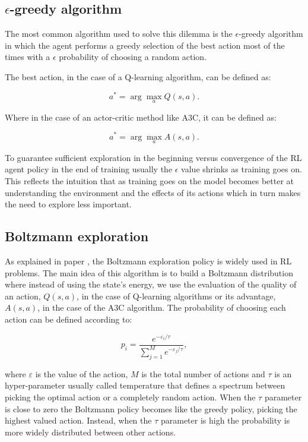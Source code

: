 \subsection{$\epsilon$-greedy algorithm}
\noindent The most common algorithm used to solve this dilemma is the $\epsilon$-greedy algorithm in which the agent performs a greedy selection of the best action most of the times with a $\epsilon$ probability of choosing a random action.

The best action, in the case of a Q-learning algorithm, can be defined as:

\begin{equation}
    a^* =\arg\max\limits_{a} Q(s, a).
\end{equation}

Where in the case of an actor-critic method like A3C, it can be defined as:

\begin{equation}
    a^* =\arg\max\limits_{a} A(s, a).
\end{equation}

To guarantee sufficient exploration in the beginning versus convergence of the \acrshort{RL} agent policy in the end of training usually the $\epsilon$ value shrinks as training goes on. This reflects the intuition that as training goes on the model becomes better at understanding the environment and the effects of its actions which in turn makes the need to explore less important.

\subsection{Boltzmann exploration} \label{boltz}
\noindent As explained in paper \cite{boltz}, the Boltzmann exploration policy is widely used in \acrshort{RL} problems. The main idea of this algorithm is to build a Boltzmann distribution where instead of using the state's energy, we use the evaluation of the quality of an action, $Q(s,a)$, in the case of Q-learning algorithms or its advantage, $A(s,a)$, in the case of the \acrshort{A3C} algorithm. The probability of choosing each action can be defined according to:

\begin{equation}
    p_i = \frac{e^{-\varepsilon_i/\tau}}{\sum\limits_{j=1}^M e^{-\varepsilon_j/\tau}},
\end{equation}

where $\varepsilon$ is the value of the action, $M$ is the total number of actions and $\tau$ is an hyper-parameter usually called temperature that defines a spectrum between picking the optimal action or a completely random action. When the $\tau$ parameter is close to zero the Boltzmann policy becomes like the greedy policy, picking the highest valued action. Instead, when the $\tau$ parameter is high the probability is more widely distributed between other actions. 


